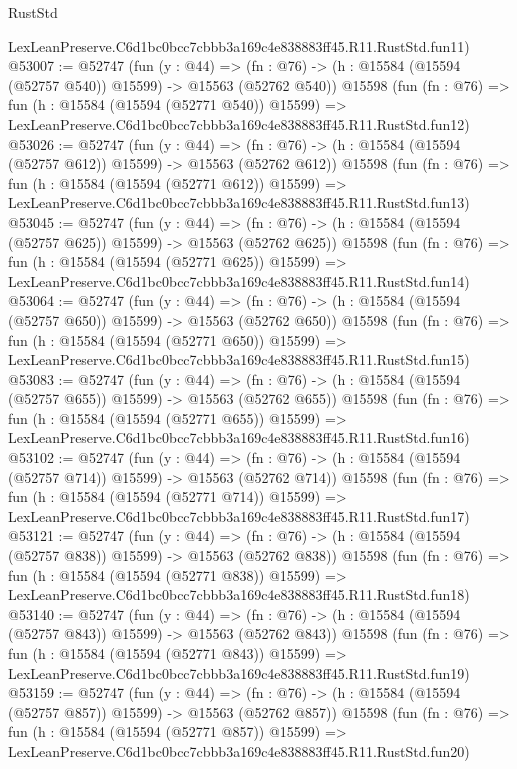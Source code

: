 \begin{lexlean}{RustStd}
\begin{coremodule}
    LexLeanPreserve.C6d1bc0bcc7cbbb3a169c4e838883ff45.R11.RustStd.fun11)
@53007 := @52747
    (fun (y : @44) =>
    (fn : @76) -> (h : @15584 (@15594 (@52757 @540)) @15599) -> @15563 (@52762 @540))
    @15598
    (fun (fn : @76) =>
    fun (h : @15584 (@15594 (@52771 @540)) @15599) =>
    LexLeanPreserve.C6d1bc0bcc7cbbb3a169c4e838883ff45.R11.RustStd.fun12)
@53026 := @52747
    (fun (y : @44) =>
    (fn : @76) -> (h : @15584 (@15594 (@52757 @612)) @15599) -> @15563 (@52762 @612))
    @15598
    (fun (fn : @76) =>
    fun (h : @15584 (@15594 (@52771 @612)) @15599) =>
    LexLeanPreserve.C6d1bc0bcc7cbbb3a169c4e838883ff45.R11.RustStd.fun13)
@53045 := @52747
    (fun (y : @44) =>
    (fn : @76) -> (h : @15584 (@15594 (@52757 @625)) @15599) -> @15563 (@52762 @625))
    @15598
    (fun (fn : @76) =>
    fun (h : @15584 (@15594 (@52771 @625)) @15599) =>
    LexLeanPreserve.C6d1bc0bcc7cbbb3a169c4e838883ff45.R11.RustStd.fun14)
@53064 := @52747
    (fun (y : @44) =>
    (fn : @76) -> (h : @15584 (@15594 (@52757 @650)) @15599) -> @15563 (@52762 @650))
    @15598
    (fun (fn : @76) =>
    fun (h : @15584 (@15594 (@52771 @650)) @15599) =>
    LexLeanPreserve.C6d1bc0bcc7cbbb3a169c4e838883ff45.R11.RustStd.fun15)
@53083 := @52747
    (fun (y : @44) =>
    (fn : @76) -> (h : @15584 (@15594 (@52757 @655)) @15599) -> @15563 (@52762 @655))
    @15598
    (fun (fn : @76) =>
    fun (h : @15584 (@15594 (@52771 @655)) @15599) =>
    LexLeanPreserve.C6d1bc0bcc7cbbb3a169c4e838883ff45.R11.RustStd.fun16)
@53102 := @52747
    (fun (y : @44) =>
    (fn : @76) -> (h : @15584 (@15594 (@52757 @714)) @15599) -> @15563 (@52762 @714))
    @15598
    (fun (fn : @76) =>
    fun (h : @15584 (@15594 (@52771 @714)) @15599) =>
    LexLeanPreserve.C6d1bc0bcc7cbbb3a169c4e838883ff45.R11.RustStd.fun17)
@53121 := @52747
    (fun (y : @44) =>
    (fn : @76) -> (h : @15584 (@15594 (@52757 @838)) @15599) -> @15563 (@52762 @838))
    @15598
    (fun (fn : @76) =>
    fun (h : @15584 (@15594 (@52771 @838)) @15599) =>
    LexLeanPreserve.C6d1bc0bcc7cbbb3a169c4e838883ff45.R11.RustStd.fun18)
@53140 := @52747
    (fun (y : @44) =>
    (fn : @76) -> (h : @15584 (@15594 (@52757 @843)) @15599) -> @15563 (@52762 @843))
    @15598
    (fun (fn : @76) =>
    fun (h : @15584 (@15594 (@52771 @843)) @15599) =>
    LexLeanPreserve.C6d1bc0bcc7cbbb3a169c4e838883ff45.R11.RustStd.fun19)
@53159 := @52747
    (fun (y : @44) =>
    (fn : @76) -> (h : @15584 (@15594 (@52757 @857)) @15599) -> @15563 (@52762 @857))
    @15598
    (fun (fn : @76) =>
    fun (h : @15584 (@15594 (@52771 @857)) @15599) =>
    LexLeanPreserve.C6d1bc0bcc7cbbb3a169c4e838883ff45.R11.RustStd.fun20)

\end{coremodule}
\end{lexlean}
